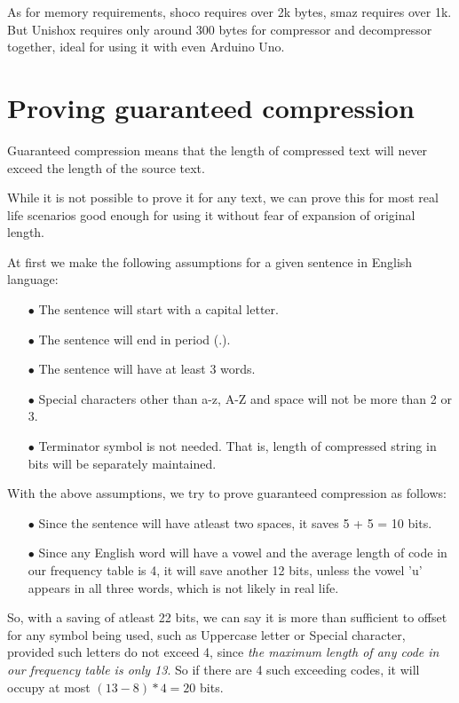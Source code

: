 \documentclass[]{article}
\begin{document}
		
As for memory requirements, shoco requires over 2k bytes, smaz requires over 1k. But Unishox requires only around $300$ bytes for compressor and decompressor together, ideal for using it with even Arduino Uno.

\section{Proving guaranteed compression}

Guaranteed compression means that the length of compressed text will never exceed the length of the source text.

While it is not possible to prove it for any text, we can prove this for most real life scenarios good enough for using it without fear of expansion of original length.

At first we make the following assumptions for a given sentence in English language:
\begin{itemize}
	\item[$\bullet$] The sentence will start with a capital letter.
	\item[$\bullet$] The sentence will end in period (.).
	\item[$\bullet$] The sentence will have at least 3 words.
	\item[$\bullet$] Special characters other than a-z, A-Z and space will not be more than 2 or 3.
	\item[$\bullet$] Terminator symbol is not needed. That is, length of compressed string in bits will be separately maintained.
\end{itemize}

With the above assumptions, we try to prove guaranteed compression as follows:

\begin{itemize}
	\item[$\bullet$] Since the sentence will have atleast two spaces, it saves 5 + 5 = 10 bits.
	\item[$\bullet$] Since any English word will have a vowel and the average length of code in our frequency table is 4, it will save another 12 bits, unless the vowel 'u' appears in all three words, which is not likely in real life.
\end{itemize}

So, with a saving of atleast 22 bits, we can say it is more than sufficient to offset for any symbol being used, such as Uppercase letter or Special character, provided such letters do not exceed 4, since \emph{the maximum length of any code in our frequency table is only 13}.  So if there are 4 such exceeding codes, it will occupy at most $(13 - 8) * 4 = 20$ bits.
\end{document}

